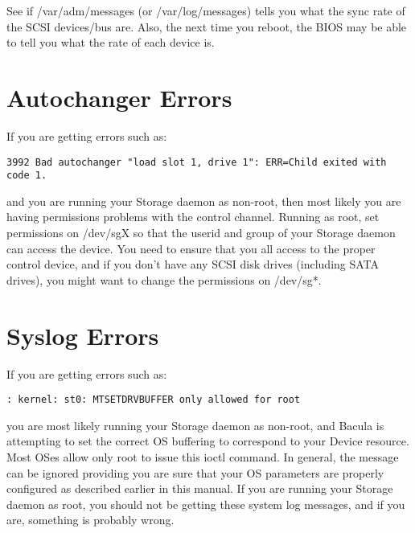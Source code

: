 See if /var/adm/messages (or /var/log/messages) tells you what the sync
rate of the SCSI devices/bus are. Also, the next time you reboot, the
BIOS may be able to tell you what the rate of each device is.


\section{Autochanger Errors}

If you are getting errors such as:

\footnotesize
\begin{verbatim}
3992 Bad autochanger "load slot 1, drive 1": ERR=Child exited with code 1.
\end{verbatim}
\normalsize

and you are running your Storage daemon as non-root, then most likely
you are having permissions problems with the control channel. Running
as root, set permissions on /dev/sgX so that the userid and group of
your Storage daemon can access the device. You need to ensure that you
all access to the proper control device, and if you don't have any
SCSI disk drives (including SATA drives), you might want to change
the permissions on /dev/sg*.

\section{Syslog Errors}

If you are getting errors such as:

\footnotesize
\begin{verbatim}
: kernel: st0: MTSETDRVBUFFER only allowed for root
\end{verbatim}
\normalsize

you are most likely running your Storage daemon as non-root, and
Bacula is attempting to set the correct OS buffering to correspond
to your Device resource. Most OSes allow only root to issue this
ioctl command. In general, the message can be ignored providing 
you are sure that your OS parameters are properly configured as
described earlier in this manual.  If you are running your Storage daemon 
as root, you should not be getting these system log messages, and if
you are, something is probably wrong.
